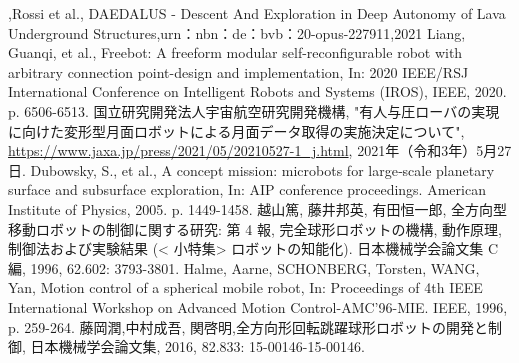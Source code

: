 \documentclass[a4paper,11pt,dvipdfmx.uplatex]{jsarticle}
\begin{document}
\begin{thebibliography}{99}
,Rossi et al., DAEDALUS - Descent And Exploration in Deep Autonomy of Lava Underground Structures,urn：nbn：de：bvb：20-opus-227911,2021
Liang, Guanqi, et al., Freebot: A freeform modular self-reconfigurable robot with arbitrary connection point-design and implementation, In: 2020 IEEE/RSJ International Conference on Intelligent Robots and Systems (IROS), IEEE, 2020. p. 6506-6513.
国立研究開発法人宇宙航空研究開発機構, "有人与圧ローバの実現に向けた変形型月面ロボットによる月面データ取得の実施決定について", \url{https://www.jaxa.jp/press/2021/05/20210527-1_j.html}, 2021年（令和3年）5月27日.
Dubowsky, S., et al., A concept mission: microbots for large‐scale planetary surface and subsurface exploration, In: AIP conference proceedings. American Institute of Physics, 2005. p. 1449-1458.
越山篤, 藤井邦英, 有田恒一郎, 全方向型移動ロボットの制御に関する研究: 第 4 報, 完全球形ロボットの機構, 動作原理, 制御法および実験結果 (< 小特集> ロボットの知能化). 日本機械学会論文集 C 編, 1996, 62.602: 3793-3801.
Halme, Aarne, SCHONBERG, Torsten, WANG, Yan, Motion control of a spherical mobile robot, In: Proceedings of 4th IEEE International Workshop on Advanced Motion Control-AMC'96-MIE. IEEE, 1996, p. 259-264.
藤岡潤,中村成吾, 関啓明,全方向形回転跳躍球形ロボットの開発と制御, 日本機械学会論文集, 2016, 82.833: 15-00146-15-00146.

\end{thebibliography} 
\end{document}
